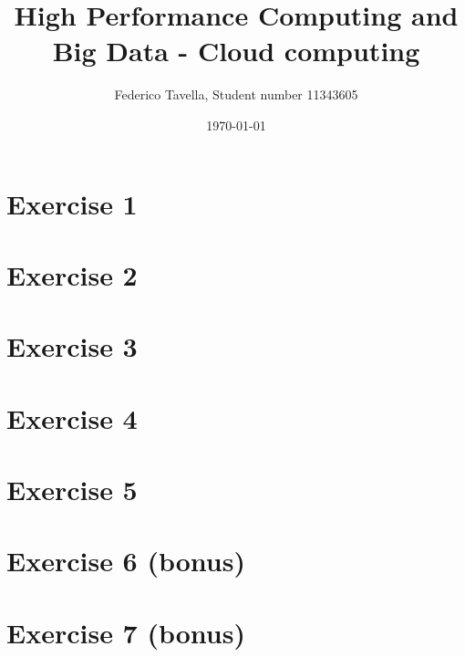 \documentclass[a4paper]{article}
\title{High Performance Computing and Big Data - Cloud computing}
\author{Federico Tavella, Student number 11343605}
\date{\today}
\begin{document}
\maketitle

\section{Exercise 1}

\section{Exercise 2}

\section{Exercise 3}

\section{Exercise 4}

\section{Exercise 5}

\section{Exercise 6 (bonus)}

\section{Exercise 7 (bonus)}
\end{document}
